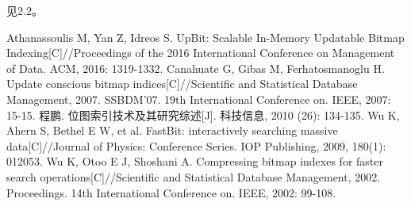 \documentclass[11pt, a4paper]{article}
\begin{document}
  见2.2。


\renewcommand\refname{参考文献}
\begin{thebibliography}{99}
Athanassoulis M, Yan Z, Idreos S. UpBit: Scalable In-Memory Updatable Bitmap Indexing[C]//Proceedings of the 2016 International Conference on Management of Data. ACM, 2016: 1319-1332.
Canahuate G, Gibas M, Ferhatosmanoglu H. Update conscious bitmap indices[C]//Scientific and Statistical Database Management, 2007. SSBDM'07. 19th International Conference on. IEEE, 2007: 15-15.
程鹏. 位图索引技术及其研究综述[J]. 科技信息, 2010 (26): 134-135.
Wu K, Ahern S, Bethel E W, et al. FastBit: interactively searching massive data[C]//Journal of Physics: Conference Series. IOP Publishing, 2009, 180(1): 012053.
Wu K, Otoo E J, Shoshani A. Compressing bitmap indexes for faster search operations[C]//Scientific and Statistical Database Management, 2002. Proceedings. 14th International Conference on. IEEE, 2002: 99-108.
\end{thebibliography}
\end{document}
